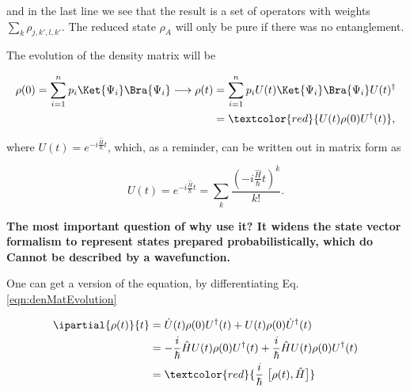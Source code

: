 \noindent and in the last line we see that the result is a set of operators with weights $\sum_{k}\rho_{j,k',l,k'}$. The reduced state $\rho_A$ will only be pure if there was no entanglement. 

The evolution of the density matrix will be

\begin{equation}
\label{eqn:denMatEvolution}
\begin{aligned}
\rho(0) = \sum_{i=1}^{n} p_i\Ket{\Psi_i}\Bra{\Psi_i} \longrightarrow \rho(t) & = \sum_{i=1}^{n} p_iU(t)\Ket{\Psi_i}\Bra{\Psi_i}U(t)^{\dagger}\\
& =  \textcolor{red}{U(t)\rho(0)U^\dagger(t)},
\end{aligned}
\end{equation}

\noindent where $U(t) = e^{-i\frac{\hat{H}}{\hbar}t}$, which, as a reminder, can be written out in matrix form as

\begin{equation}
U(t) = e^{-i\frac{\hat{H}}{\hbar}t} = \sum_k \frac{\left( -i\frac{\hat{H}}{\hbar}t\right)^k }{k!}.
\end{equation}

\textbf{The most important question of why use it? It widens the state vector formalism to represent states prepared probabilistically, which do {\LARGE Cannot be described by a wavefunction.}}

One can get a version of the \schrodinger equation, by differentiating Eq.\eqref{eqn:denMatEvolution}

\begin{equation}
\label{eqn:vonNeuman}
\begin{aligned}
\ipartial{\rho(t)}{t} & = \dot{U}(t)\rho(0)U^\dagger(t) + {U}(t)\rho(0)\dot{U}^\dagger(t)\\
& = -\frac{i}{\hbar}\hat{H}{U}(t)\rho(0)U^\dagger(t) + \frac{i}{\hbar}\hat{H}{U}(t)\rho(0){U}^\dagger(t)\\
& =  \textcolor{red}{\frac{i}{\hbar}\ \big[\rho(t),\hat{H}\big]}
\end{aligned}
\end{equation}
\newpage  
